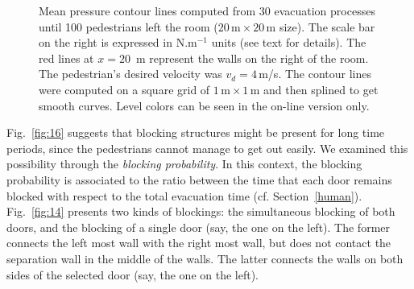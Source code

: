 \begin{figure}[!htbp]
\hfill
{}
\caption{\label{fig:16and17} Mean pressure contour lines computed from 30 
evacuation processes until 100 pedestrians left the room 
($20\,\mathrm{m}\times20\,\mathrm{m}$ size). The scale bar on the right is 
expressed in N.m$^{-1}$ units (see text for details). The red lines at 
$x=20$~m represent the walls on the right of the room. The pedestrian's desired 
velocity was $v_d=4\,$m/s. The contour lines were computed on a square grid of 
$1\,\mathrm{m}\times1\,\mathrm{m}$ and then splined to get smooth curves. Level 
colors can be seen in the on-line version only.} 
\end{figure}


Fig.~\ref{fig:16} suggests that blocking structures might be present for long 
time periods, since the pedestrians cannot manage to get out easily. We 
examined this possibility through the \textit{blocking probability}. In this 
context, the blocking probability is associated to the ratio between the time 
that each door remains blocked with respect to the total evacuation time (cf. 
Section~\ref{human}). Fig.~\ref{fig:14} presents two kinds of blockings: the 
simultaneous blocking of both doors, and the blocking of a single door (say, 
the one on the left). The former connects the left most wall with the right 
most wall, but does not contact the separation wall in the middle of the walls. 
The latter connects the walls on both sides of the selected door (say, 
the one on the left). \\


